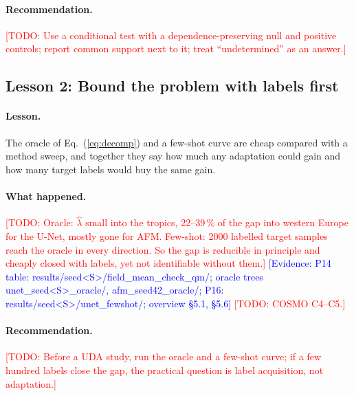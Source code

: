 \documentclass{ametsocV6.2}
\newcommand{\todo}[1]{\textcolor{red}{[TODO: #1]}}
\newcommand{\ev}[1]{\textcolor{blue}{[Evidence: #1]}}
\newcommand{\lamhat}{\hat{\lambda}}
\begin{document}
\paragraph{Recommendation.} \todo{Use a conditional test with a
dependence-preserving null and positive controls; report common support
next to it; treat ``undetermined'' as an answer.}


\subsection{Lesson 2: Bound the problem with labels first}\label{sec:L2}

\paragraph{Lesson.} The oracle of Eq.~(\ref{eq:decomp}) and a few-shot
curve are cheap compared with a method sweep, and together they say how
much any adaptation could gain and how many target labels would buy the
same gain.

\paragraph{What happened.} \todo{Oracle: $\lamhat$ small into the tropics,
22--39\,\% of the gap into western Europe for the U-Net, mostly gone for
AFM. Few-shot: 2000 labelled target samples reach the oracle in every
direction. So the gap is reducible in principle and cheaply closed with
labels, yet not identifiable without them.}
\ev{P14 table: results/seed<S>/field\_mean\_check\_qm/; oracle trees
unet\_seed<S>\_oracle/, afm\_seed42\_oracle/; P16:
results/seed<S>/unet\_fewshot/; overview \S5.1, \S5.6}
\todo{COSMO C4--C5.}

\paragraph{Recommendation.} \todo{Before a UDA study, run the oracle and
a few-shot curve; if a few hundred labels close the gap, the practical
question is label acquisition, not adaptation.}


\end{document}
